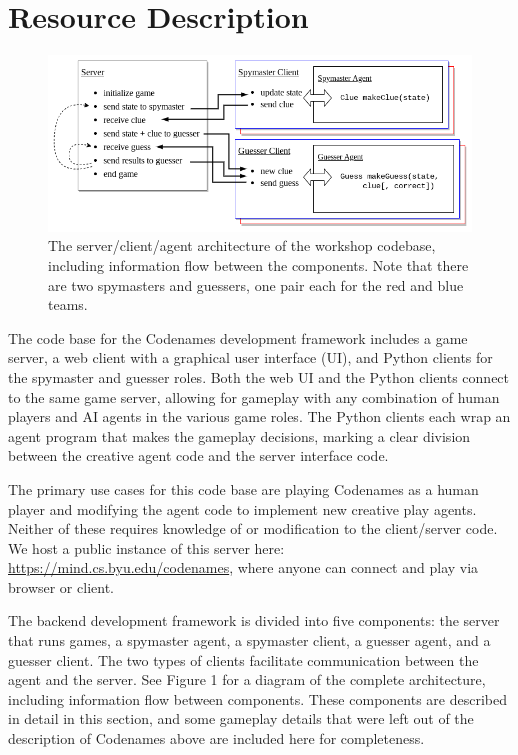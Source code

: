 \documentclass[phd,electronic,oneside,twosidetoc,letterpaper,chaptercenter,parttop,lof]{byumsphd}
\begin{document}
\section{Resource Description}

\begin{figure}[t!]
    \centering
    \includegraphics[width=.95\textwidth]{images/codenames/server-client.png}
    \caption[Server-client architecture]{The server/client/agent architecture of the workshop codebase, including information flow between the components. Note that there are two spymasters and guessers, one
pair each for the red and blue teams.}
    \label{fig:server-client-architecture}
\end{figure}

The code base for the Codenames development framework includes a game server, a web client with a graphical user interface (UI), and Python clients for the spymaster and guesser roles. Both the web UI and the Python clients connect to the same game server, allowing for gameplay with any combination of human players and AI agents in the various game roles. The Python clients each wrap an agent program that makes the gameplay decisions, marking a clear division between the creative agent code and the server interface code.

The primary use cases for this code base are playing Codenames as a human player and modifying the agent code to implement new creative play agents. Neither of these requires knowledge of or modification to the client/server code. We host a public instance of this server here: \url{https://mind.cs.byu.edu/codenames}, where anyone can connect and play via browser or client.

The backend development framework is divided into five components: the server that runs games, a spymaster agent, a spymaster client, a guesser agent, and a guesser client. The two types of clients facilitate communication between the agent and the server. See Figure 1 for a diagram of the complete architecture, including information flow between components. These components are described in detail in this section, and some gameplay details that were left out of the description of Codenames above are included here for completeness. 
\end{document}
